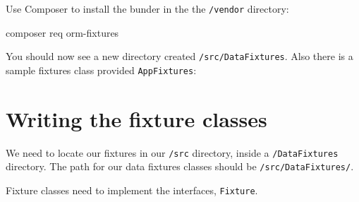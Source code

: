 \documentclass[a4paperpaper,openright]{book}
\newenvironment{Shaded}{}{}
\newcommand{\CommentTok}[1]{\textcolor[rgb]{0.38,0.63,0.69}{\textit{#1}}}
\newcommand{\ExtensionTok}[1]{#1}
\newcommand{\FunctionTok}[1]{\textcolor[rgb]{0.02,0.16,0.49}{#1}}
\newcommand{\KeywordTok}[1]{\textcolor[rgb]{0.00,0.44,0.13}{\textbf{#1}}}
\newcommand{\NormalTok}[1]{#1}
\newcommand{\OtherTok}[1]{\textcolor[rgb]{0.00,0.44,0.13}{#1}}
\begin{document}
Use Composer to install the bunder in the the \texttt{/vendor}
directory:

\begin{Shaded}
\begin{Highlighting}[]
    \ExtensionTok{composer}\NormalTok{ req orm-fixtures}
\end{Highlighting}
\end{Shaded}

You should now see a new directory created \texttt{/src/DataFixtures}.
Also there is a sample fixtures class provided \texttt{AppFixtures}:

\begin{Shaded}
\end{Shaded}

\hypertarget{writing-the-fixture-classes}{%
\section{Writing the fixture
classes}\label{writing-the-fixture-classes}}

We need to locate our fixtures in our \texttt{/src} directory, inside a
\texttt{/DataFixtures} directory. The path for our data fixtures classes
should be \texttt{/src/DataFixtures/}.

Fixture classes need to implement the interfaces, \texttt{Fixture}.
\end{document}

